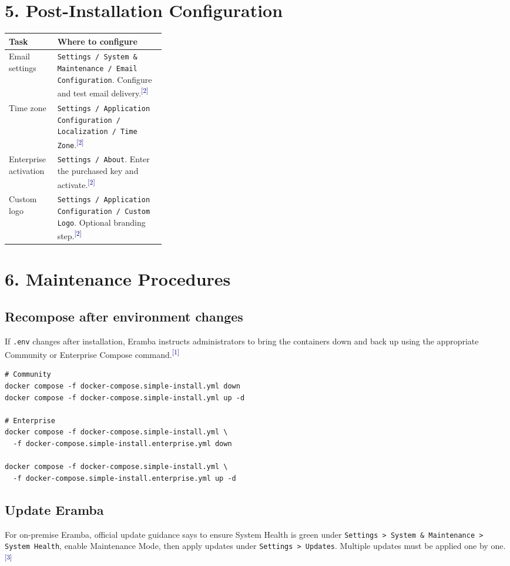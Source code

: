 \documentclass[10pt,letterpaper]{article}
\newcommand{\source}[1]{\textsuperscript{\textcolor{navy}{#1}}}
\begin{document}
\section{5. Post-Installation Configuration}
\begin{center}
\begin{tabularx}{\linewidth}{L{0.31\linewidth}Y}
\toprule
\textbf{Task} & \textbf{Where to configure} \\
\midrule
Email settings & \texttt{Settings / System \& Maintenance / Email Configuration}. Configure and test email delivery.\source{[2]} \\
Time zone & \texttt{Settings / Application Configuration / Localization / Time Zone}.\source{[2]} \\
Enterprise activation & \texttt{Settings / About}. Enter the purchased key and activate.\source{[2]} \\
Custom logo & \texttt{Settings / Application Configuration / Custom Logo}. Optional branding step.\source{[2]} \\
\bottomrule
\end{tabularx}
\end{center}

\section{6. Maintenance Procedures}
\subsection{Recompose after environment changes}
If \texttt{.env} changes after installation, Eramba instructs administrators to bring the containers down and back up using the appropriate Community or Enterprise Compose command.\source{[1]}

\begin{verbatim}
# Community
docker compose -f docker-compose.simple-install.yml down
docker compose -f docker-compose.simple-install.yml up -d

# Enterprise
docker compose -f docker-compose.simple-install.yml \
  -f docker-compose.simple-install.enterprise.yml down

docker compose -f docker-compose.simple-install.yml \
  -f docker-compose.simple-install.enterprise.yml up -d
\end{verbatim}

\subsection{Update Eramba}
For on-premise Eramba, official update guidance says to ensure System Health is green under \texttt{Settings > System \& Maintenance > System Health}, enable Maintenance Mode, then apply updates under \texttt{Settings > Updates}. Multiple updates must be applied one by one.\source{[3]}
\end{document}
